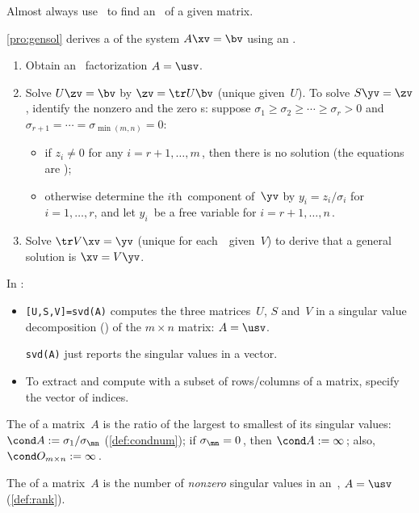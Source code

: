 \begin{itemize}
Almost always use \script\ to find an \svd\ of a given matrix.

\itemhi \cref{pro:gensol} derives a  of the system $A\xv=\bv$ using an \svd.
\begin{enumerate}
\item Obtain an \svd\ factorization \(A=\usv\).
\item Solve \(U\zv=\bv\) by $\zv=\tr U\bv$ (unique given~\(U\)).
\itemme To solve \(S\yv=\zv\), identify the nonzero and the zero s: suppose \(\sigma_1\geq\sigma_2\geq\cdots\geq\sigma_r>0\) and \(\sigma_{r+1}=\cdots=\sigma_{\min(m,n)}=0\):
\begin{itemize}
\item if $z_i\neq0$ for any \(i=r+1,\ldots,m\)\,, then there is {no solution} (the equations are );
\item otherwise determine the $i$th~component of~$\yv$ by
$y_i=z_i/\sigma_i$ for $i=1,\ldots,r$, and let $y_i$~be a {free variable} for $i=r+1,\ldots,n$\,. 
\end{itemize}

\item Solve \(\tr V\xv=\yv\) (unique for each~\yv\ given~\(V\)) to derive that a general solution is $\xv=V\yv$.
\end{enumerate}

\itemhi In \script:
\begin{itemize}
\item {}\verb|[U,S,V]=svd(A)| computes the three matrices~\(U\), \(S\) and~\(V\) in a singular value decomposition (\svd) of the \(m\times n\) matrix: \(A=\usv\).

\verb|svd(A)| just reports the singular values in a vector.

\item To extract and compute with a subset of rows\slash columns of a matrix, specify the vector of indices.
\end{itemize}


\itemme The  of a matrix~\(A\) is the ratio of the largest to smallest of its {singular value}s: \(\cond A:=\sigma_1/\sigma_{\mn}\) (\cref{def:condnum}); 
if \(\sigma_{\mn}=0\)\,, then \(\cond A:=\infty\)\,; 
also, \(\cond O_{m\times n}:=\infty\)\,.

\itemhi The  of a matrix~$A$ is the number of \emph{nonzero} {singular value}s in an~\svd, \(A=\usv\) (\cref{def:rank}).


\end{itemize}
